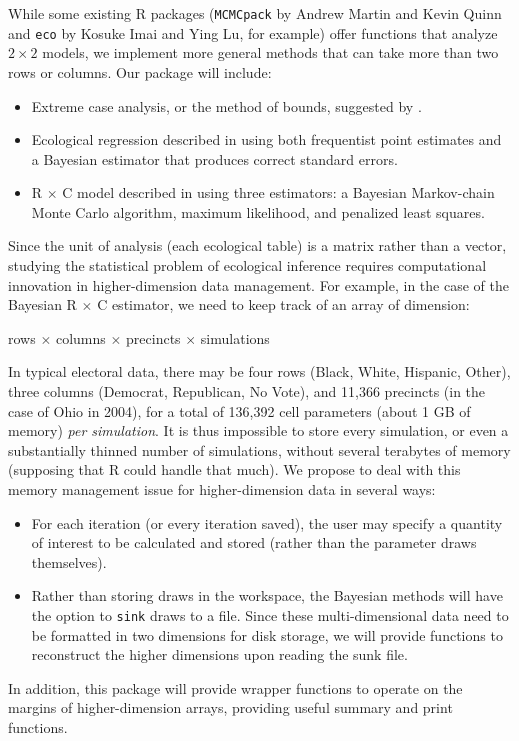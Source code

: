\documentclass[10pt]{article}
\begin{document}
While some existing R packages ({\tt MCMCpack} by Andrew Martin and
Kevin Quinn\nocite{MCMCpack} and {\tt eco} by Kosuke Imai and Ying
Lu\nocite{eco}, for example) offer functions that analyze $2 \times 2$
models, we implement more general methods that can take more than two
rows or columns.  Our package will include:
\begin{itemize}
\item Extreme case analysis, or the method of bounds, suggested by
\cite{DunDav53}. 
\item Ecological regression described in \cite{Goodman53} using both
frequentist point estimates and a Bayesian estimator that produces
correct standard errors.
\item R $\times$ C model described in \cite{RosJiaKin01} using three
estimators: a Bayesian Markov-chain Monte Carlo algorithm, maximum
likelihood, and penalized least squares.
\end{itemize}  

Since the unit of analysis (each ecological table) is a matrix rather
than a vector, studying the statistical problem of ecological
inference requires computational innovation in higher-dimension data
management.  For example, in the case of the Bayesian R $\times$ C
estimator, we need to keep track of an array of dimension:  
\begin{center}
rows $\times$ columns $\times$ precincts $\times$ simulations
\end{center}
In typical electoral data, there may be four rows (Black, White,
Hispanic, Other), three columns (Democrat, Republican, No Vote), and
11,366 precincts (in the case of Ohio in 2004), for a total of 136,392
cell parameters (about 1 GB of memory) \emph{per simulation}.  It is
thus impossible to store every simulation, or even a substantially
thinned number of simulations, without several terabytes of memory
(supposing that R could handle that much).  We propose to deal with
this memory management issue for higher-dimension data in several ways:  
\begin{itemize}
\item For each iteration (or every iteration saved), the user may
specify a quantity of interest to be calculated and stored (rather
than the parameter draws themselves).   
\item Rather than storing draws in the workspace, the Bayesian methods
will have the option to {\tt sink} draws to a file.  Since these
multi-dimensional data need to be formatted in two dimensions for disk
storage, we will provide functions to reconstruct the higher
dimensions upon reading the sunk file.  
\end{itemize}
In addition, this package will provide wrapper functions to operate on
the margins of higher-dimension arrays, providing useful summary and
print functions.  
\clearpage


\end{document}
